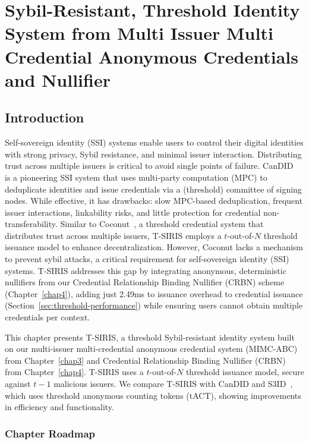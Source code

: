 \chapter{Sybil-Resistant, Threshold Identity System from Multi Issuer Multi Credential Anonymous Credentials and Nullifier}\label{chap6}

\section{Introduction}\label{sec:threshold-intro}
Self-sovereign identity (SSI) systems enable users to control their digital identities with strong privacy, Sybil resistance, and minimal issuer interaction. Distributing trust across multiple issuers is critical to avoid single points of failure. CanDID~\cite{maram_candid_2020} is a pioneering SSI system that uses multi-party computation (MPC) to deduplicate identities and issue credentials via a (threshold) committee of signing nodes. While effective, it has drawbacks: slow MPC-based deduplication, frequent issuer interactions, linkability risks, and little protection for credential non-transferability. Similar to Coconut~\cite{sonnino_coconut_2020}, a threshold credential system that distributes trust across multiple issuers, T-SIRIS employs a $t$-out-of-$N$ threshold issuance model to enhance decentralization. However, Coconut lacks a mechanism to prevent sybil attacks, a critical requirement for self-sovereign identity (SSI) systems. T-SIRIS addresses this gap by integrating anonymous, deterministic nullifiers from our Credential Relationship Binding Nullifier (CRBN) scheme (Chapter~\ref{chap4}), adding just 2.49ms to issuance overhead to credential issuance (Section~\ref{sec:threshold-performance}) while ensuring users cannot obtain multiple credentials per context.

This chapter presents T-SIRIS, a threshold Sybil-resistant identity system built on our multi-issuer multi-credential anonymous credential system (MIMC-ABC) from Chapter~\ref{chap3} and Credential Relationship Binding Nullifier (CRBN) from Chapter~\ref{chap4}. T-SIRIS uses a $t$-out-of-$N$ threshold issuance model, secure against $t-1$ malicious issuers. We compare T-SIRIS with CanDID and S3ID~\cite{rabaninejad_attribute-based_2024}, which uses threshold anonymous counting tokens (tACT), showing improvements in efficiency and functionality.


\subsection*{Chapter Roadmap}

